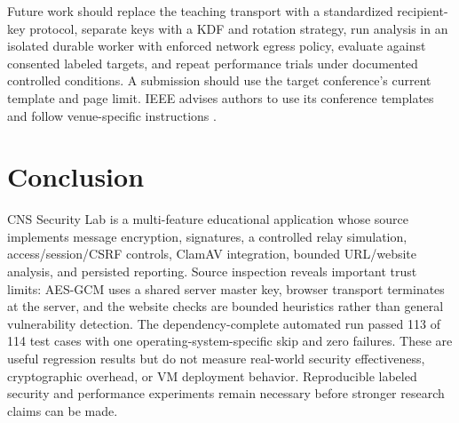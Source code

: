 \documentclass[conference]{IEEEtran}
\begin{document}
Future work should replace the teaching transport with a standardized recipient-key protocol, separate keys with a KDF and rotation strategy, run analysis in an isolated durable worker with enforced network egress policy, evaluate against consented labeled targets, and repeat performance trials under documented controlled conditions. A submission should use the target conference's current template and page limit. IEEE advises authors to use its conference templates and follow venue-specific instructions \cite{ieeetemplate}.

\section{Conclusion}
CNS Security Lab is a multi-feature educational application whose source implements message encryption, signatures, a controlled relay simulation, access/session/CSRF controls, ClamAV integration, bounded URL/website analysis, and persisted reporting. Source inspection reveals important trust limits: AES-GCM uses a shared server master key, browser transport terminates at the server, and the website checks are bounded heuristics rather than general vulnerability detection. The dependency-complete automated run passed 113 of 114 test cases with one operating-system-specific skip and zero failures. These are useful regression results but do not measure real-world security effectiveness, cryptographic overhead, or VM deployment behavior. Reproducible labeled security and performance experiments remain necessary before stronger research claims can be made.



\end{document}

